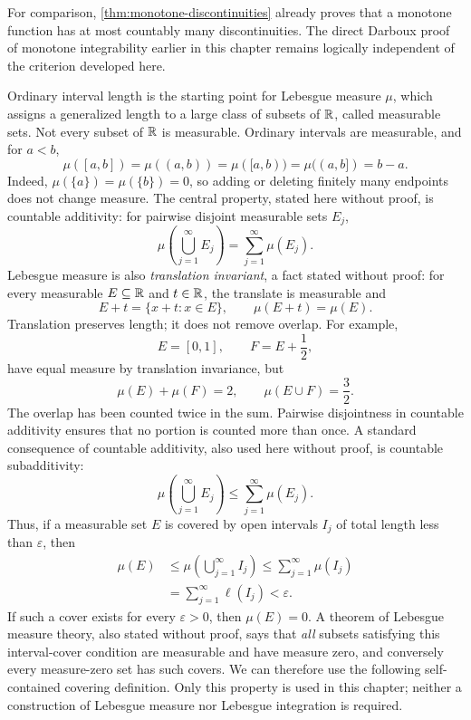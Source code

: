 For comparison, \cref{thm:monotone-discontinuities} already proves that a
monotone function has at most countably many discontinuities. The direct
Darboux proof of monotone integrability earlier in this chapter remains
logically independent of the criterion developed here.

Ordinary interval length is the starting point for Lebesgue measure \(\mu\),
which assigns a generalized length to a large class of subsets of $\mathbb{R}$,
called measurable sets. Not every subset of $\mathbb{R}$ is measurable. Ordinary
intervals are measurable, and for \(a<b\),
\[
\boxed{
\mu([a,b])=\mu((a,b))=\mu([a,b))=\mu((a,b])=b-a.}
\]
Indeed, \(\mu(\{a\})=\mu(\{b\})=0\), so adding or deleting finitely many
endpoints does not change measure.
The central property, stated here without proof, is countable additivity:
for pairwise disjoint measurable sets $E_j$,
\[
\mu\!\left(\bigcup_{j=1}^{\infty}E_j\right)
=\sum_{j=1}^{\infty}\mu(E_j).
\]
Lebesgue measure is also \emph{translation invariant}, a fact stated
without proof: for every measurable $E\subseteq\mathbb{R}$ and $t\in\mathbb{R}$, the
translate is measurable and
\[
E+t=\{x+t:x\in E\},\qquad \mu(E+t)=\mu(E).
\]
Translation preserves length; it does not remove overlap. For example,
\[
E=[0,1],\qquad F=E+\frac12,
\]
have equal measure by translation invariance, but
\[
\mu(E)+\mu(F)=2,\qquad \mu(E\cup F)=\frac32.
\]
The overlap has been counted twice in the sum. Pairwise disjointness in
countable additivity ensures that no portion is counted more than once.
A standard consequence of countable additivity, also used here without
proof, is countable subadditivity:
\[
\mu\!\left(\bigcup_{j=1}^{\infty}E_j\right)
\leq\sum_{j=1}^{\infty}\mu(E_j).
\]
Thus, if a measurable set $E$ is covered by open intervals $I_j$ of total
length less than $\varepsilon$, then
\[
\begin{aligned}
\mu(E)&\leq \mu\!\left(\bigcup_{j=1}^{\infty}I_j\right)
\leq\sum_{j=1}^{\infty}\mu(I_j)\\
&=\sum_{j=1}^{\infty}\ell(I_j)<\varepsilon.
\end{aligned}
\]
If such a cover exists for every $\varepsilon>0$, then \(\mu(E)=0\).
A theorem of Lebesgue measure theory, also stated without proof, says that
\emph{all} subsets satisfying this interval-cover condition are measurable
and have measure zero, and conversely every measure-zero set has such covers.
We can therefore use the following self-contained covering definition.
Only this property is used in this chapter; neither a construction of
Lebesgue measure nor Lebesgue integration is required.

